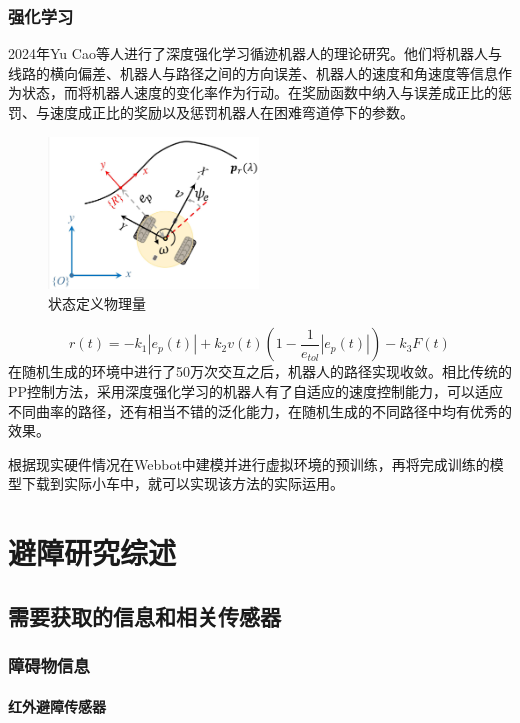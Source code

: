\documentclass{report}
\begin{document}
\subsubsection{强化学习}
\label{subsec:label}
2024年Yu Cao等人进行了深度强化学习循迹机器人的理论研究\cite{cao2024path}。他们将机器人与线路的横向偏差、机器人与路径之间的方向误差、机器人的速度和角速度等信息作为状态，而将机器人速度的变化率作为行动。在奖励函数中纳入与误差成正比的惩罚、与速度成正比的奖励以及惩罚机器人在困难弯道停下的参数。

\begin{figure}[ht]
  \centering
  \includegraphics[width=0.5\textwidth]{figures/state.png}
  \caption{状态定义物理量\cite{cao2024path}}
\end{figure}

\[ r\left(t\right)=-k_{1}\left|e_{p}\left(t\right)\right|+k_{2}v\left(t\right)\left(1-\frac{1}{e_{tol}}\left|e_{p}\left(t\right)\right|\right)-k_{3}F\left(t\right) \]
在随机生成的环境中进行了50万次交互之后，机器人的路径实现收敛。相比传统的PP控制方法，采用深度强化学习的机器人有了自适应的速度控制能力，可以适应不同曲率的路径，还有相当不错的泛化能力，在随机生成的不同路径中均有优秀的效果。

根据现实硬件情况在Webbot中建模并进行虚拟环境的预训练，再将完成训练的模型下载到实际小车中，就可以实现该方法的实际运用。
\section{避障研究综述}
\label{sec:label}
\subsection{需要获取的信息和相关传感器}
\label{subsec:label}
\subsubsection{障碍物信息}
\label{subsec:label}
\paragraph{红外避障传感器}
\end{document}
